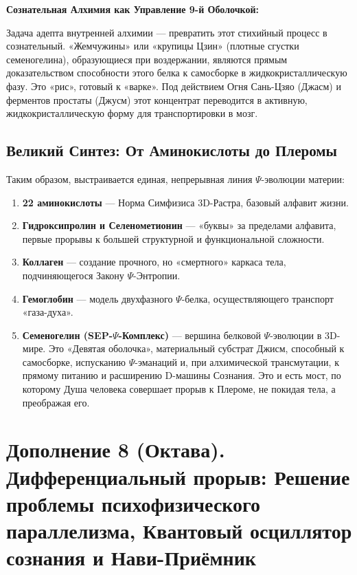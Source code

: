 \documentclass[a4paper,12pt]{article}
\begin{document}
\textbf{Сознательная Алхимия как Управление 9-й Оболочкой:}

Задача адепта внутренней алхимии — превратить этот стихийный процесс в сознательный. «Жемчужины» или «крупицы Цзин» (плотные сгустки семеногелина), образующиеся при воздержании, являются прямым доказательством способности этого белка к самосборке в жидкокристаллическую фазу. Это «рис», готовый к «варке». Под действием Огня Сань-Цзяо (Джасм) и ферментов простаты (Джусм) этот концентрат переводится в активную, жидкокристаллическую форму для транспортировки в мозг.

\subsection{Великий Синтез: От Аминокислоты до Плеромы}

Таким образом, выстраивается единая, непрерывная линия $\Psi$-эволюции материи:

\begin{enumerate}
	\item \textbf{22 аминокислоты} — Норма Симфизиса 3D-Растра, базовый алфавит жизни.
	\item \textbf{Гидроксипролин и Селенометионин} — «буквы» за пределами алфавита, первые прорывы к большей структурной и функциональной сложности.
	\item \textbf{Коллаген} — создание прочного, но «смертного» каркаса тела, подчиняющегося Закону $\Psi$-Энтропии.
	\item \textbf{Гемоглобин} — модель двухфазного $\Psi$-белка, осуществляющего транспорт «газа-духа».
	\item \textbf{Семеногелин (SEP-$\Psi$-Комплекс)} — вершина белковой $\Psi$-эволюции в 3D-мире. Это «Девятая оболочка», материальный субстрат Джисм, способный к самосборке, испусканию $\Psi$-эманаций и, при алхимической трансмутации, к прямому питанию и расширению D-машины Сознания. Это и есть мост, по которому Душа человека совершает прорыв к Плероме, не покидая тела, а преображая его.
\end{enumerate}

    \newpage
    \section{Дополнение 8 (Октава). Дифференциальный прорыв: Решение проблемы психофизического параллелизма, Квантовый осциллятор сознания и Нави-Приёмник}
    
\end{document}

